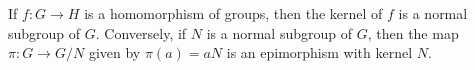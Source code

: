 \begin{theorem}
If $f: G \rightarrow H$ is a homomorphism of groups, then the kernel of $f$ is a normal subgroup of $G$. Conversely, if $N$ is a normal subgroup of $G$, then the map $\pi: G \rightarrow G/N$ given by $\pi(a) = aN$ is an epimorphism with kernel $N$.
\end{theorem}
